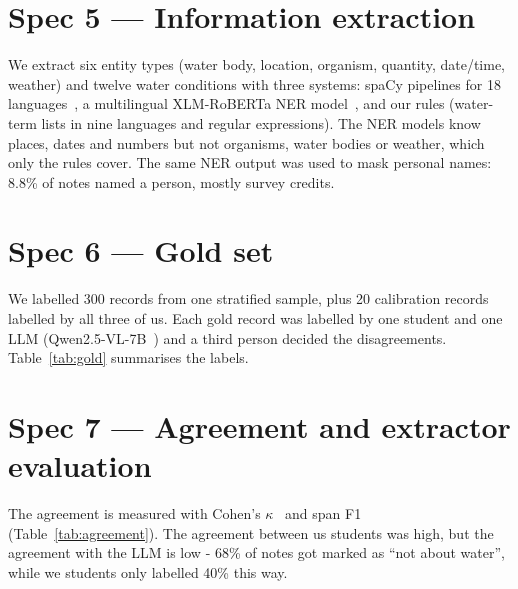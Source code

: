 \section{Spec 5 --- Information extraction}

We extract six entity types (water body, location, organism, quantity, date/time, weather) and twelve water conditions
with three systems: spaCy pipelines for 18 languages~\cite{honnibal2020spacy}, a multilingual XLM-RoBERTa NER
model~\cite{conneau2020xlmr}, and our rules (water-term lists in nine languages and regular expressions). The NER
models know places, dates and numbers but not organisms, water bodies or weather, which only the rules cover. The
same NER output was used to mask personal names: 8.8\% of notes named a person, mostly survey credits.

\section{Spec 6 --- Gold set}

We labelled 300 records from one stratified sample, plus 20 calibration records labelled by
all three of us. Each gold record was labelled by one student and one LLM
(Qwen2.5-VL-7B~\cite{bai2025qwen25vl}) and a third person decided the disagreements. Table~\ref{tab:gold} summarises the
labels.

\begin{table}[htbp]
\centering\small
\caption{Gold set (300 records).}
\label{tab:gold}
\end{table}

\section{Spec 7 --- Agreement and extractor evaluation}

The agreement is measured with Cohen's $\kappa$~\cite{cohen1960kappa} and span F1 (Table~\ref{tab:agreement}). 
The agreement between us students was high, but the agreement with the LLM is low - 68\% of notes got marked as ``not about water'', 
while we students only labelled 40\% this way.

